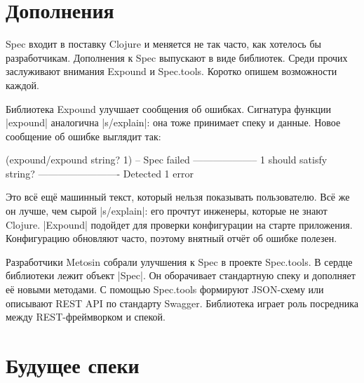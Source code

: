 \section{Дополнения}

Spec входит в поставку Clojure и меняется не так часто, как хотелось бы
разработчикам. Дополнения к Spec выпускают в виде библиотек. Среди прочих
заслуживают внимания Expound и Spec.tools. Коротко опишем возможности каждой.


Библиотека Expound улучшает сообщения об
ошибках. Сигнатура функции \spverb|expound| аналогична \spverb|s/explain|: она
тоже принимает спеку и данные. Новое сообщение об ошибке выглядит так:


\begin{english}
  \begin{clojure}
(expound/expound string? 1)
-- Spec failed --------------------
  1
should satisfy
  string?
-------------------------
Detected 1 error
  \end{clojure}
\end{english}


Это вс\"{е} ещ\"{е} машинный текст, который нельзя показывать пользователю. Вс\"{е} же
он лучше, чем сырой \spverb|s/explain|: его прочтут инженеры, которые не знают
Clojure. \spverb|Expound| подойдет для проверки конфигурации на старте
приложения. Конфигурацию обновляют часто, поэтому внятный отч\"{е}т об ошибке
полезен.


Разработчики Metosin собрали улучшения к Spec в проекте
Spec.tools. В сердце библиотеки
лежит объект \spverb|Spec|. Он оборачивает стандартную спеку и дополняет е\"{е}
новыми методами. С помощью Spec.tools формируют JSON-схему или описывают REST
API по стандарту Swagger. Библиотека играет роль посредника между
REST-фреймворком и спекой.

\section{Будущее спеки}


